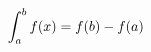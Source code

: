\documentclass[preview]{standalone}
\begin{document}
\begin{align*}
\special{dvisvgm:raw <g id='unique000'>}\int_a^b f(x) = f(b) - f(a)\special{dvisvgm:raw </g>}
\end{align*}
\end{document}
